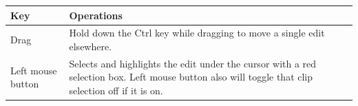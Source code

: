 \renewcommand{\arraystretch}{1.15}
\begin{center}
  \begin{longtable}{p{} p{}}
    \toprule
    \textbf{Key} & \textbf{Operations}\\
    \midrule
    Drag & Hold down the Ctrl key while dragging to move a single
           edit elsewhere.\\
    Left mouse button & Selects and highlights the edit under the
                        cursor with a red selection box. Left mouse
                        button also will toggle that clip selection
                        off if it is on.\\
    \bottomrule
  \end{longtable}
\end{center}

